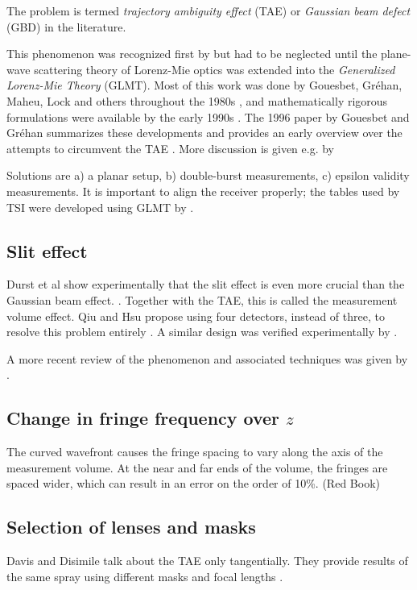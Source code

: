 \documentclass[11.5pt]{book}
\begin{document}
The problem is termed \emph{trajectory ambiguity effect} (TAE) or \emph{Gaussian
beam defect} (GBD) in the literature.

This phenomenon was recognized first by \citet{Saffman86} but had to be neglected until
the plane-wave scattering theory of Lorenz-Mie optics was extended into
the \emph{Generalized Lorenz-Mie Theory} (GLMT). Most of this work was
done by Gouesbet, Gréhan, Maheu, Lock and others throughout the 1980s
\cite{Grehan80, Gouesbet82, Gouesbet88, Maheu88}, and mathematically
rigorous formulations were available by the early 1990s \cite{Lock94,
Gouesbet94}. The 1996 paper by Gouesbet and Gréhan summarizes these developments
and provides an early overview over the attempts to circumvent the TAE
\cite{Gouesbet96}. More discussion is given e.g. by 

Solutions are a) a planar setup, b) double-burst measurements, c) epsilon
validity measurements. It is important to align the receiver properly; the
tables used by TSI were developed using GLMT by \citet{Naqwi96}.

\subsection{Slit effect}
Durst et al show experimentally that the slit effect is even more crucial than
the Gaussian beam effect. \cite{Durst94}. Together with the TAE, this
is called the measurement volume effect. Qiu and Hsu propose using four
detectors, instead of three, to resolve this problem entirely \cite{Qiu99}. A
similar design was verified experimentally by \citet{Sipperley14}.

A more recent review of the phenomenon and associated techniques was given by
\citet{Strakey00, Strakey01}.

\subsection{Change in fringe frequency over $z$}
The curved wavefront causes the fringe spacing to vary along the axis of the
measurement volume. At the near and far ends of the volume, the fringes are
spaced wider, which can result in an error on the order of 10\%. (Red Book)

\subsection{Selection of lenses and masks}
Davis and Disimile talk about the TAE only tangentially. They provide results of
the same spray using different masks and focal lengths \cite{Davis04}.
\end{document}
